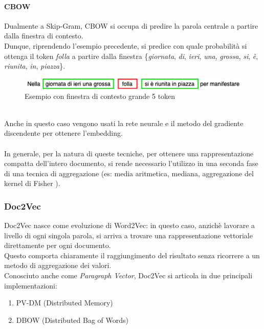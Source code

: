 \documentclass[12pt]{report}
\theoremstyle{definition}
\begin{document}
\paragraph{CBOW}
Dualmente a Skip-Gram, CBOW si occupa di predire la parola centrale a partire dalla finestra di contesto.
\\
Dunque, riprendendo l'esempio precedente, si predice con quale probabilità si ottenga il token \textit{folla} a partire dalla finestra \{\textit{giornata}, \textit{di}, \textit{ieri}, \textit{una}, \textit{grossa}, \textit{si}, \textit{è}, \textit{riunita}, \textit{in}, \textit{piazza}\}.
\\
\begin{figure}[!h]
    \centering
    \includegraphics[scale = 0.7]{images/cbow.png}
    \caption{Esempio con finestra di contesto grande 5 token}
    \label{cbow}
\end{figure}
\\
Anche in questo caso vengono usati la rete neurale e il metodo del gradiente discendente per ottenere l'embedding.
\\
\\
In generale, per la natura di queste tecniche, per ottenere una rappresentazione compatta dell'intero documento, si rende necessario l'utilizzo in una seconda fase di una tecnica di aggregazione (es: media aritmetica, mediana, aggregazione del kernel di Fisher \cite{19}).

\subsubsection{Doc2Vec} \label{d2v}
Doc2Vec nasce come evoluzione di Word2Vec: in questo caso, anzichè lavorare a livello di ogni singola parola, si arriva a trovare una rappresentazione vettoriale direttamente per ogni documento.
\\
Questo comporta chiaramente il raggiungimento del risultato senza ricorrere a un metodo di aggregazione dei valori.
\\
Conosciuto anche come \textit{Paragraph Vector}, Doc2Vec si articola in due principali implementazioni:
\begin{enumerate}
    \item PV-DM (Distributed Memory)
    \item DBOW (Distributed Bag of Words)
\end{enumerate}
\end{document}
